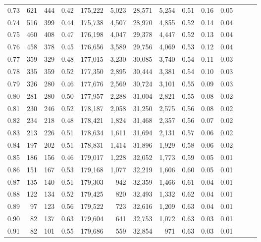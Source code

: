 \begin{tabular}{rrrrrrrrrrrrrr}
0.73 &    621 &  444 &  0.42 &  175,222 &    5,023 &  28,571 &   5,254 &  0.51 &  0.16 &      0.05 \\
0.74 &    516 &  399 &  0.44 &  175,738 &    4,507 &  28,970 &   4,855 &  0.52 &  0.14 &      0.04 \\
0.75 &    460 &  408 &  0.47 &  176,198 &    4,047 &  29,378 &   4,447 &  0.52 &  0.13 &      0.04 \\
0.76 &    458 &  378 &  0.45 &  176,656 &    3,589 &  29,756 &   4,069 &  0.53 &  0.12 &      0.04 \\
0.77 &    359 &  329 &  0.48 &  177,015 &    3,230 &  30,085 &   3,740 &  0.54 &  0.11 &      0.03 \\
0.78 &    335 &  359 &  0.52 &  177,350 &    2,895 &  30,444 &   3,381 &  0.54 &  0.10 &      0.03 \\
0.79 &    326 &  280 &  0.46 &  177,676 &    2,569 &  30,724 &   3,101 &  0.55 &  0.09 &      0.03 \\
0.80 &    281 &  280 &  0.50 &  177,957 &    2,288 &  31,004 &   2,821 &  0.55 &  0.08 &      0.02 \\
0.81 &    230 &  246 &  0.52 &  178,187 &    2,058 &  31,250 &   2,575 &  0.56 &  0.08 &      0.02 \\
0.82 &    234 &  218 &  0.48 &  178,421 &    1,824 &  31,468 &   2,357 &  0.56 &  0.07 &      0.02 \\
0.83 &    213 &  226 &  0.51 &  178,634 &    1,611 &  31,694 &   2,131 &  0.57 &  0.06 &      0.02 \\
0.84 &    197 &  202 &  0.51 &  178,831 &    1,414 &  31,896 &   1,929 &  0.58 &  0.06 &      0.02 \\
0.85 &    186 &  156 &  0.46 &  179,017 &    1,228 &  32,052 &   1,773 &  0.59 &  0.05 &      0.01 \\
0.86 &    151 &  167 &  0.53 &  179,168 &    1,077 &  32,219 &   1,606 &  0.60 &  0.05 &      0.01 \\
0.87 &    135 &  140 &  0.51 &  179,303 &      942 &  32,359 &   1,466 &  0.61 &  0.04 &      0.01 \\
0.88 &    122 &  134 &  0.52 &  179,425 &      820 &  32,493 &   1,332 &  0.62 &  0.04 &      0.01 \\
0.89 &     97 &  123 &  0.56 &  179,522 &      723 &  32,616 &   1,209 &  0.63 &  0.04 &      0.01 \\
0.90 &     82 &  137 &  0.63 &  179,604 &      641 &  32,753 &   1,072 &  0.63 &  0.03 &      0.01 \\
0.91 &     82 &  101 &  0.55 &  179,686 &      559 &  32,854 &     971 &  0.63 &  0.03 &      0.01 \\

\end{tabular}
